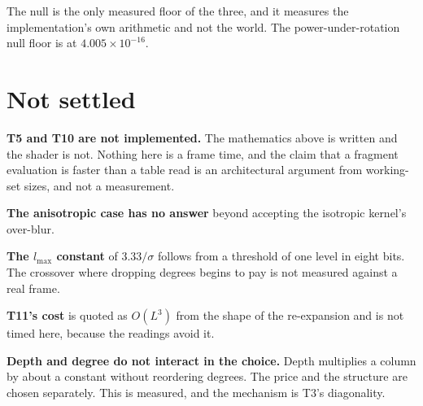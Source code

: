 The null is the only measured floor of the three, and it measures the implementation's own arithmetic and not the world. The power-under-rotation null floor is at \(4.005 \times 10^{-16}\).

\section{Not settled}

\textbf{T5 and T10 are not implemented.} The mathematics above is written and the shader is not. Nothing here is a frame time, and the claim that a fragment evaluation is faster than a table read is an architectural argument from working-set sizes, and not a measurement.

\textbf{The anisotropic case has no answer} beyond accepting the isotropic kernel's over-blur.

\textbf{The \(l_{\max}\) constant} of \(3.33/\sigma\) follows from a threshold of one level in eight bits. The crossover where dropping degrees begins to pay is not measured against a real frame.

\textbf{T11's cost} is quoted as \(O(L^3)\) from the shape of the re-expansion and is not timed here, because the readings avoid it.

\textbf{Depth and degree do not interact in the choice.} Depth multiplies a column by about a constant without reordering degrees. The price and the structure are chosen separately. This is measured, and the mechanism is T3's diagonality.
